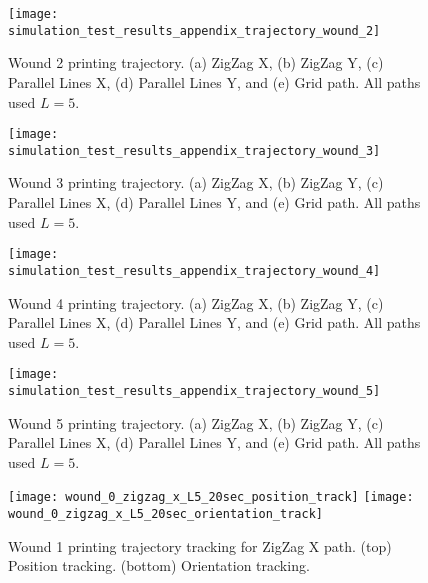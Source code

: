 \begin{figure}[htbp]
	\centering
	\texttt{[image: simulation\_test\_results\_appendix\_trajectory\_wound\_2]}
	\caption[Wound 2 printing trajectory.]{Wound 2 printing trajectory. (a) ZigZag X, (b) ZigZag Y, (c) Parallel Lines X, (d) Parallel Lines Y, and (e) Grid path. All paths used $L = 5$.}
    \label{fig:simulation_test_results_appendix_trajectory_wound_2}
\end{figure}

\begin{figure}[htbp]
	\centering
	\texttt{[image: simulation\_test\_results\_appendix\_trajectory\_wound\_3]}
	\caption[Wound 3 printing trajectory.]{Wound 3 printing trajectory. (a) ZigZag X, (b) ZigZag Y, (c) Parallel Lines X, (d) Parallel Lines Y, and (e) Grid path. All paths used $L = 5$.}
    \label{fig:simulation_test_results_appendix_trajectory_wound_3}
\end{figure}

\begin{figure}[htbp]
	\centering
	\texttt{[image: simulation\_test\_results\_appendix\_trajectory\_wound\_4]}
	\caption[Wound 4 printing trajectory.]{Wound 4 printing trajectory. (a) ZigZag X, (b) ZigZag Y, (c) Parallel Lines X, (d) Parallel Lines Y, and (e) Grid path. All paths used $L = 5$.}
    \label{fig:simulation_test_results_appendix_trajectory_wound_4}
\end{figure}

\begin{figure}[htbp]
	\centering
	\texttt{[image: simulation\_test\_results\_appendix\_trajectory\_wound\_5]}
	\caption[Wound 5 printing trajectory.]{Wound 5 printing trajectory. (a) ZigZag X, (b) ZigZag Y, (c) Parallel Lines X, (d) Parallel Lines Y, and (e) Grid path. All paths used $L = 5$.}
    \label{fig:simulation_test_results_appendix_trajectory_wound_5}
\end{figure}


\begin{figure}[htbp]
	\centering
	\texttt{[image: wound\_0\_zigzag\_x\_L5\_20sec\_position\_track]}
	\texttt{[image: wound\_0\_zigzag\_x\_L5\_20sec\_orientation\_track]}
	\caption[Wound 1 printing trajectory tracking for ZigZag X path.]{Wound 1 printing trajectory tracking for ZigZag X path. (top) Position tracking. (bottom) Orientation tracking.}
    \label{fig:simulation_test_results_appendix_trajectory_tracking_wound_1_zizzag_x_tracking}
\end{figure}

